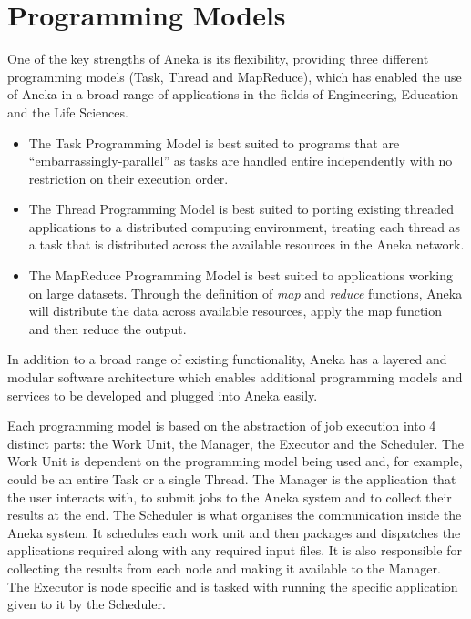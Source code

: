 \section{Programming Models}
One of the key strengths of Aneka is its flexibility, providing three different programming models (Task, Thread and MapReduce), which has enabled the use of Aneka in a broad range of applications in the fields of Engineering, Education and the Life Sciences.
\begin{itemize}
\item The Task Programming Model is best suited to programs that are ``embarrassingly-parallel'' as tasks are handled entire independently with no restriction on their execution order.

\item The Thread Programming Model is best suited to porting existing threaded applications to a distributed computing environment, treating each thread as a task that is distributed across the available resources in the Aneka network.

\item The MapReduce Programming Model is best suited to applications working on large datasets. Through the definition of \emph{map} and \emph{reduce} functions, Aneka will distribute the data across available resources, apply the map function and then reduce the output.
\end{itemize}

In addition to a broad range of existing functionality, Aneka has a layered and modular software architecture which enables additional programming models and services to be developed and plugged into Aneka easily.

Each programming model is based on the abstraction of job execution into 4 distinct parts: the Work Unit, the Manager, the Executor and the Scheduler. The Work Unit is dependent on the programming model being used and, for example, could be an entire Task or a single Thread. The Manager is the application that the user interacts with, to submit jobs to the Aneka system and to collect their results at the end. The Scheduler is what organises the communication inside the Aneka system. It schedules each work unit and then packages and dispatches the applications required along with any required input files. It is also responsible for collecting the results from each node and making it available to the Manager. The Executor is node specific and is tasked with running the specific application given to it by the Scheduler.

